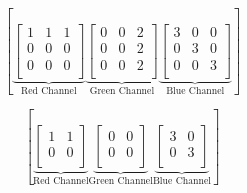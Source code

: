 \documentclass[xcolor={table}]{beamer}
\begin{document}
 \begin{frame} 
 \begin{equation}
    \left[
    \underbrace{
  \left[ {\begin{array}{ccc}
   1 & 1 & 1 \\
   0 & 0 & 0 \\
   0 & 0 & 0 \\ 
  \end{array} } \right]
  }_{\text{Red Channel}}
  \underbrace{
    \left[ {\begin{array}{ccc}
   0 & 0 & 2 \\
   0 & 0 & 2 \\
   0 & 0 & 2 \\
  \end{array} } \right]
  }_{\text{Green Channel}}
  \underbrace{
    \left[ {\begin{array}{ccc}
   3 & 0 & 0 \\
   0 & 3 & 0 \\
   0 & 0 & 3 \\
  \end{array} } \right]
  }_{\text{Blue Channel}}
  \right]
  \label{eqn:3dimage}
\end{equation}
\end{frame} 



 \begin{frame} 
 \begin{equation}
    \left[
    \underbrace{
  \left[ {\begin{array}{ccc}
   1 & 1 \\
   0 & 0 \\
  \end{array} } \right]
  }_{\text{Red Channel}}
  \underbrace{
    \left[ {\begin{array}{ccc}
   0 & 0 \\
   0 & 0 \\
  \end{array} } \right]
  }_{\text{Green Channel}}
  \underbrace{
    \left[ {\begin{array}{ccc}
   3 & 0 \\
   0 & 3 \\
  \end{array} } \right]
  }_{\text{Blue Channel}}
  \right]
  \label{eqn:3dlocalreceptivefield}
\end{equation}
\end{frame} 
\end{document}
